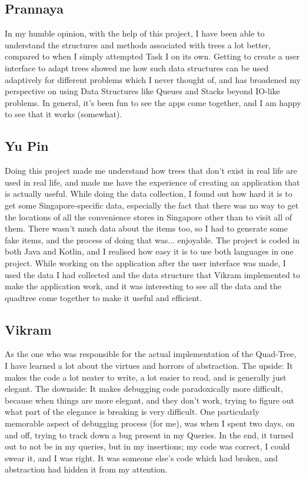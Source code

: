\documentclass[12pt]{article}
\begin{document}
{\subsection{Prannaya}
In my humble opinion, with the help of this project, I have been able to understand the structures and methods associated with trees a lot better, compared to when I simply attempted Task I on its own. Getting to create a user interface to adapt trees showed me how such data structures can be used adaptively for different problems which I never thought of, and has broadened my perspective on using Data Structures like Queues and Stacks beyond IO-like problems. In general, it's been fun to see the apps come together, and I am happy to see that it works (somewhat).

\subsection{Yu Pin}

Doing this project made me understand how trees that don't exist in real life are used in real life, and made me have the experience of creating an application that is actually useful. While doing the data collection, I found out how hard it is to get some Singapore-specific data, especially the fact that there was no way to get the locations of all the convenience stores in Singapore other than to visit all of them. There wasn't much data about the items too, so I had to generate some fake items, and the process of doing that was... enjoyable. The project is coded in both Java and Kotlin, and I realised how easy it is to use both languages in one project. While working on the application after the user interface was made, I used the data I had collected and the data structure that Vikram implemented to make the application work, and it was interesting to see all the data and the quadtree come together to make it useful and efficient.

\subsection{Vikram}

As the one who was responsible for the actual implementation of the Quad-Tree, I have learned a lot about the virtues and horrors of abstraction. The upside: It makes the code a lot neater to write, a lot easier to read, and is generally just elegant. The downside: It makes debugging code paradoxically more difficult, because when things are more elegant, and they don't work, trying to figure out what part of the elegance is breaking is very difficult. One particularly memorable aspect of debugging process (for me), was when I spent two days, on and off, trying to track down a bug present in my Queries. In the end, it turned out to not be in my queries, but in my insertions; my code was correct, I could swear it, and I was right. It was someone else's code which had broken, and abstraction had hidden it from my attention.

}
\end{document}
